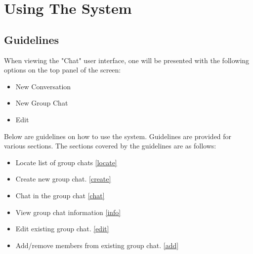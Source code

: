 \documentclass[11pt]{article}
\begin{document}
\section{Using The System}


\subsection{Guidelines}
When viewing the "Chat" user interface, one will be presented with the following options on the top panel of the screen:
\begin{itemize}
\item New Conversation
\item New Group Chat
\item Edit
\end{itemize}
Below are guidelines on how to use the system. Guidelines are provided for various sections. The sections covered by the guidelines are as follows:

\begin{itemize}
\item Locate list of group chats \ref{locate}
\item Create new group chat. \ref{create}
\item Chat in the group chat \ref{chat}
\item View group chat information \ref{info}
\item Edit existing group chat. \ref{edit}
\item Add/remove members from existing group chat. \ref{add}
\end{itemize}
\end{document}
